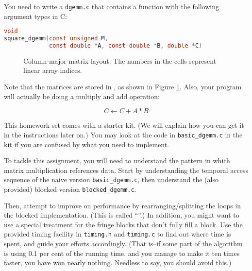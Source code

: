 \documentclass[11pt]{article}
\begin{document}
\begin{enumerate}
You need to write a \texttt{dgemm.c} that contains a function with the
following argument types in C:

\begin{lstlisting}[language=C]
void
square_dgemm(const unsigned M,
             const double *A, const double *B, double *C)
\end{lstlisting}

\begin{figure}

\begin{center}
\end{center}

\caption{Column-major matrix layout. The numbers in the cells
represent linear array indices.}
\label{fig:column-major}
\end{figure}

Note that the matrices are stored in
, as shown in Figure \ref{fig:column-major}.  Also, your
program will actually be doing a multiply and add operation:

\[
  C \leftarrow C + A*B
\]

This homework set comes with a starter kit. (We will explain how you
can get it in the instructions later on.) You may look at the code in
\verb|basic_dgemm.c| in the kit if you are confused by what you need
to implement.

To tackle this assignment, you will need to understand the pattern in
which matrix multiplication references data. Start by understanding
the temporal access sequence of the naive version
\verb|basic_dgemm.c|, then understand the (also provided) blocked
version \verb|blocked_dgemm.c|.

Then, attempt to improve on performance by rearranging/splitting the
loops in the blocked implementation.  (This is called
``''.)
In addition, you might want to use a special treatment for the fringe
blocks that don't fully fill a block. Use the provided timing facility
in \texttt{timing.h} and \texttt{timing.c} to find out where time is
spent, and guide your efforts accordingly. (That is--if some part of
the algorithm is using 0.1 per cent of the running time, and you
manage to make it ten times faster, you have won nearly nothing.
Needless to say, you should avoid this.)


\end{enumerate}
\end{document}
